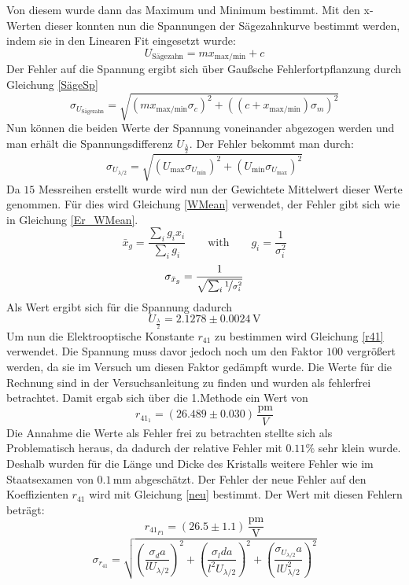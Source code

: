 Von diesem wurde dann das Maximum und Minimum bestimmt. Mit den x-Werten dieser konnten nun die Spannungen der Sägezahnkurve bestimmt werden, indem sie in den Linearen Fit eingesetzt wurde:
\begin{equation}
	U_\text{Sägezahn}= mx_{\text{max/min}} + c
\end{equation}
Der Fehler auf die Spannung ergibt sich über Gaußsche Fehlerfortpflanzung durch Gleichung \ref{SägeSp}
\begin{equation}
	\sigma_{U_\text{Sägezahn}}=\sqrt{\left(mx_{\text{max/min}}\sigma_c\right)^2+\left((c + x_{\text{max/min}})\sigma_m\right)^2}
	\label{SägeSp}
\end{equation}
Nun können die beiden Werte der Spannung voneinander abgezogen werden und man erhält die Spannungsdifferenz $U_{\frac{\lambda}{2}}$. Der Fehler bekommt man durch:
\begin{equation}
	\sigma_{U_{\lambda/2}}=\sqrt{\left(U_\text{max}\sigma_{U_{\text{min}}}\right)^2+\left(U_{\text{min}}\sigma_{U_{\text{max}}}\right)^2}
	\label{Errdif}
\end{equation}
Da $15$ Messreihen erstellt wurde wird nun der Gewichtete Mittelwert dieser Werte genommen. Für dies wird Gleichung \ref{WMean} verwendet, der Fehler gibt sich wie in Gleichung \ref{Er_WMean}.
\begin{equation}
\bar{x}_g=\frac{\sum_ig_ix_i}{\sum_ig_i} \qquad \text{with} \qquad g_i=\frac{1}{\sigma_i^2}
\label{WMean}
\end{equation}
\begin{equation}
\sigma_{\bar{x}_g}=\frac{1}{\sqrt{\sum_i\nicefrac{1}{\sigma_i^2}}}
\label{Er_WMean}
\end{equation}
Als Wert ergibt sich für die Spannung dadurch $$U_{\frac{\lambda}{2}}=2.1278\pm0.0024\,\text{V}$$
Um nun die Elektrooptische Konstante $r_{41}$ zu bestimmen wird Gleichung \ref{r41} verwendet. Die Spannung muss davor jedoch noch um den Faktor $100$ vergrößert werden, da sie im Versuch um diesen Faktor gedämpft wurde. Die Werte für die Rechnung sind in der Versuchsanleitung \cite{anleitung} zu finden und wurden als fehlerfrei betrachtet. Damit ergab sich über die 1.Methode ein Wert von $$r_{41_1}=(26.489\pm0.030)\,\frac{\text{pm}}{V}$$
Die Annahme die Werte als Fehler frei zu betrachten stellte sich als Problematisch heraus, da dadurch der relative Fehler mit $0.11\%$ sehr klein wurde. Deshalb wurden für die Länge und Dicke des Kristalls weitere Fehler wie im Staatsexamen\cite{staatsex_farpock} von $0.1\,$mm abgeschätzt. Der Fehler der neue Fehler auf den Koeffizienten $r_{41}$ wird mit Gleichung \ref{neu} bestimmt. Der Wert mit diesen Fehlern beträgt:
$$r_{41_{F1}}=(26.5\pm1.1)\,\frac{\text{pm}}{\text{V}}$$
\begin{equation}
	\sigma_{r_{41}}=\sqrt{\left(\frac{\sigma_da}{lU_{\lambda/2}}\right)^2+\left(\frac{\sigma_lda}{l^2U_{\lambda/2}}\right)^2+\left(\frac{\sigma_{U_{\lambda/2}}a}{lU_{\lambda/2}^2}\right)^2}
	\label{neu}
\end{equation}
